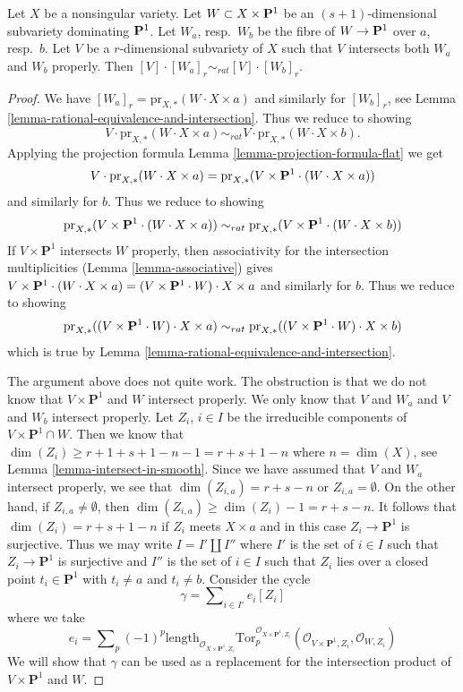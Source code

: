 \begin{lemma}
\label{lemma-well-defined-special-case}
Let $X$ be a nonsingular variety. Let
$W \subset X \times {\bf P}^1$ be an $(s + 1)$-dimensional subvariety
dominating ${\bf P}^1$. Let $W_a$, resp.\ $W_b$ be the fibre of
$W \to {\bf P}^1$ over $a$, resp.\ $b$. Let $V$ be a $r$-dimensional
subvariety of $X$ such that $V$ intersects both $W_a$ and
$W_b$ properly. Then $[V] \cdot [W_a]_r \sim_{rat} [V] \cdot [W_b]_r$.
\end{lemma}

\begin{proof}
We have $[W_a]_r = \text{pr}_{X,*}(W \cdot X \times a)$ and similarly for
$[W_b]_r$, see Lemma \ref{lemma-rational-equivalence-and-intersection}.
Thus we reduce to showing
$$
V \cdot \text{pr}_{X,*}( W \cdot X \times a) \sim_{rat} V \cdot
\text{pr}_{X,*}( W \cdot X\times b).
$$
Applying the projection formula
Lemma \ref{lemma-projection-formula-flat} we get
$$
V \cdot \text{pr}_{X,*}( W \cdot X\times a) =
\text{pr}_{X,*}(V \times {\bf P}^1 \cdot (W \cdot X\times a))
$$
and similarly for $b$. Thus we reduce to showing
$$
\text{pr}_{X,*}(V \times {\bf P}^1 \cdot (W \cdot X\times a))
\sim_{rat}
\text{pr}_{X,*}(V \times {\bf P}^1 \cdot (W \cdot X\times b))
$$
If $V \times \mathbf{P}^1$ intersects $W$ properly, then
associativity for the intersection multiplicities
(Lemma \ref{lemma-associative})
gives $V \times \mathbf{P}^1 \cdot (W \cdot X\times a) =
(V \times {\bf P}^1 \cdot W) \cdot X \times a$
and similarly for $b$.  Thus we reduce to showing
$$
\text{pr}_{X,*}((V \times {\bf P}^1 \cdot W) \cdot X\times a)
\sim_{rat}
\text{pr}_{X,*}((V \times {\bf P}^1 \cdot W) \cdot X\times b)
$$
which is true by Lemma \ref{lemma-rational-equivalence-and-intersection}.

\medskip\noindent
The argument above does not quite work. The obstruction is that
we do not know that $V \times \mathbf{P}^1$ and $W$ intersect properly.
We only know that $V$ and $W_a$ and $V$ and $W_b$ intersect properly.
Let $Z_i$, $i \in I$ be the irreducible components of
$V \times \mathbf{P}^1 \cap W$. Then we know that
$\dim(Z_i) \geq r + 1 + s + 1 - n - 1 = r + s + 1 - n$ where $n = \dim(X)$, see
Lemma \ref{lemma-intersect-in-smooth}. Since we have assumed
that $V$ and $W_a$ intersect properly, we see that
$\dim(Z_{i, a}) = r + s - n$ or $Z_{i, a} = \emptyset$.
On the other hand, if $Z_{i, a} \not = \emptyset$, then
$\dim(Z_{i, a}) \geq \dim(Z_i) - 1 = r + s - n$.
It follows that $\dim(Z_i) = r + s + 1 - n$ if $Z_i$ meets $X \times a$
and in this case $Z_i \to \mathbf{P}^1$ is surjective.
Thus we may write $I = I' \amalg I''$ where $I'$ is the set of $i \in I$
such that $Z_i \to \mathbf{P}^1$ is surjective and $I''$ is the set of
$i \in I$ such that $Z_i$ lies over a closed point $t_i \in \mathbf{P}^1$
with $t_i \not = a$ and $t_i \not = b$. Consider the cycle
$$
\gamma = \sum\nolimits_{i \in I'} e_i [Z_i]
$$
where we take
$$
e_i = \sum\nolimits_p (-1)^p
\text{length}_{\mathcal{O}_{X \times \mathbf{P}^1, Z_i}}
\text{Tor}_p^{\mathcal{O}_{X \times \mathbf{P}^1, Z_i}}(
\mathcal{O}_{V \times \mathbf{P}^1, Z_i}, \mathcal{O}_{W, Z_i})
$$
We will show that $\gamma$ can be used as a replacement for
the intersection product of $V \times \mathbf{P}^1$ and $W$.


\end{proof}
